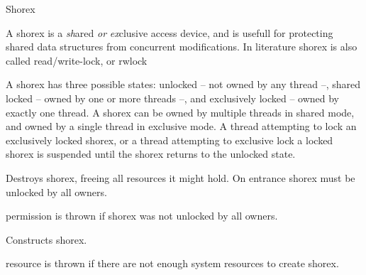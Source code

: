 
\begin{classpage}{Shorex}

A shorex is a {\em sh}ared {\em or} {\em ex}clusive access
device, and is usefull for protecting shared data structures from
concurrent modifications.
In literature shorex is also called read/write-lock, or rwlock

A shorex has three possible states: unlocked -- not owned by any
thread --, shared locked -- owned by one or more threads --, and
exclusively locked -- owned by exactly one thread. A shorex can be
owned by multiple threads in shared mode, and owned by a single thread
in exclusive mode. A thread attempting to lock an exclusively locked
shorex, or a thread attempting to exclusive lock a locked shorex is
suspended until the shorex returns to the unlocked state.


\begin{mandescription}
  \destructor
  Destroys  shorex, freeing all resources it might hold. On
  entrance  shorex must be unlocked by all owners.
  \begin{exception}
    \item[permission] is thrown if 
      shorex was not unlocked by all owners.
  \end{exception}

  \constructor{}
  Constructs  shorex.
  \begin{exception}
    \item[resource] is thrown if there are not
      enough system resources to create  shorex.
  \end{exception}


\end{mandescription}
\end{classpage}
